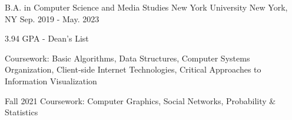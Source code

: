 

\begin{cventries}

  \cventry
    {B.A. in Computer Science and Media Studies} %
    {New York University} %
    {New York, NY} %
    {Sep. 2019 - May. 2023} %
    {
      \begin{cvitems} %
        \item {3.94 GPA - Dean's List}
        \item {Coursework: Basic Algorithms, Data Structures, Computer Systems Organization, Client-side Internet Technologies, Critical Approaches to Information Visualization}
        \item {Fall 2021 Coursework: Computer Graphics, Social Networks, Probability \& Statistics}
      \end{cvitems}
    }

\end{cventries}
